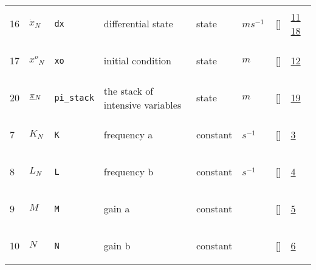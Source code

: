 \begin{longtable}{|p{1cm}|p{3cm}|p{3cm}|p{7cm}|p{3.0cm}|p{3cm}|p{2cm}|p{1cm}|}
    16
             & \hypertarget{"v:16"}{ $ {{\dot{x}}}{_{N}} $}
             & \verb|dx|
             & differential state
             & \begin{lay}state \end{lay}
             & $ m s^{-1} \, $
             & []
             & \hyperlink{"e:11"}{ 11 }
                 \hyperlink{"e:18"}{ 18 }
                 \\
    17
             & \hypertarget{"v:17"}{ $ {{x^o}}{_{N}} $}
             & \verb|xo|
             & initial condition
             & \begin{lay}state \end{lay}
             & $ m  $
             & []
             & \hyperlink{"e:12"}{ 12 }
                 \\
    20
             & \hypertarget{"v:20"}{ $ {{{{\protect\underline{\bf{\pi}}}}}}{_{N}} $}
             & \verb|pi_stack|
             & the stack of intensive variables
             & \begin{lay}state \end{lay}
             & $ m  $
             & []
             & \hyperlink{"e:19"}{ 19 }
                 \\
    7
             & \hypertarget{"v:7"}{ $ {K}{_{N}} $}
             & \verb|K|
             & frequency a
             & \begin{lay}constant \end{lay}
             & $ s^{-1} \, $
             & []
             & \hyperlink{"e:3"}{ 3 }
                 \\
    8
             & \hypertarget{"v:8"}{ $ {L}{_{N}} $}
             & \verb|L|
             & frequency b
             & \begin{lay}constant \end{lay}
             & $ s^{-1} \, $
             & []
             & \hyperlink{"e:4"}{ 4 }
                 \\
    9
             & \hypertarget{"v:9"}{ $ {M}{_{}} $}
             & \verb|M|
             & gain a
             & \begin{lay}constant \end{lay}
             & $  $
             & []
             & \hyperlink{"e:5"}{ 5 }
                 \\
    10
             & \hypertarget{"v:10"}{ $ {N}{_{}} $}
             & \verb|N|
             & gain b
             & \begin{lay}constant \end{lay}
             & $  $
             & []
             & \hyperlink{"e:6"}{ 6 }
                 \\
    \end{longtable}
